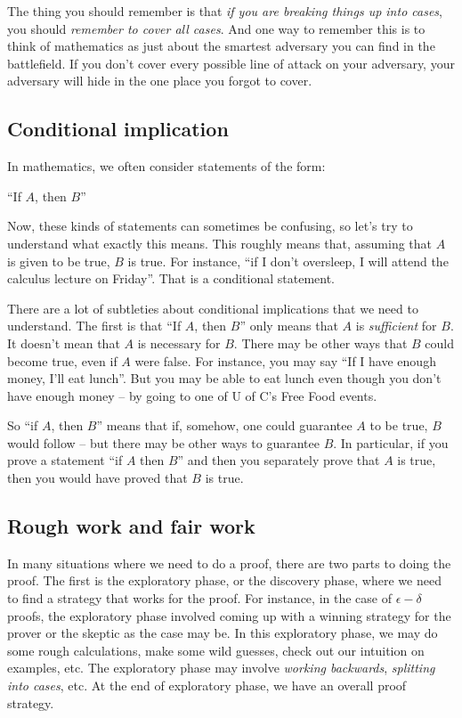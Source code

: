 \documentclass{amsart}
\begin{document}
The thing you should remember is that {\em if you are breaking things
up into cases}, you should {\em remember to cover all cases}. And one
way to remember this is to think of mathematics as just about the
smartest adversary you can find in the battlefield. If you don't cover
every possible line of attack on your adversary, your adversary will
hide in the one place you forgot to cover.

\subsection{Conditional implication}

In mathematics, we often consider statements of the form:

``If $A$, then $B$''

Now, these kinds of statements can sometimes be confusing, so let's
try to understand what exactly this means. This roughly means that,
assuming that $A$ is given to be true, $B$ is true. For instance, ``if
I don't oversleep, I will attend the calculus lecture on
Friday''. That is a conditional statement.

There are a lot of subtleties about conditional implications that we
need to understand. The first is that ``If $A$, then $B$'' only means
that $A$ is {\em sufficient} for $B$. It doesn't mean that $A$ is
necessary for $B$. There may be other ways that $B$ could become true,
even if $A$ were false. For instance, you may say ``If I have enough
money, I'll eat lunch''. But you may be able to eat lunch even though
you don't have enough money -- by going to one of U of C's Free Food
events.

So ``if $A$, then $B$'' means that if, somehow, one could guarantee
$A$ to be true, $B$ would follow -- but there may be other ways to
guarantee $B$. In particular, if you prove a statement ``if $A$ then
$B$'' and then you separately prove that $A$ is true, then you would
have proved that $B$ is true.

\subsection{Rough work and fair work}

In many situations where we need to do a proof, there are two parts to
doing the proof. The first is the exploratory phase, or the discovery
phase, where we need to find a strategy that works for the proof. For
instance, in the case of $\epsilon-\delta$ proofs, the exploratory
phase involved coming up with a winning strategy for the prover or the
skeptic as the case may be. In this exploratory phase, we may do some
rough calculations, make some wild guesses, check out our intuition on
examples, etc. The exploratory phase may involve {\em working
backwards}, {\em splitting into cases}, etc. At the end of exploratory
phase, we have an overall proof strategy.
\end{document}
